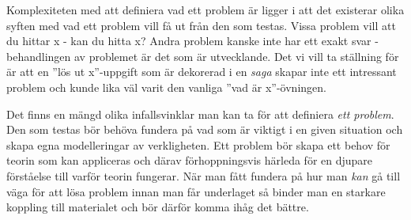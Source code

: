 
\textcolor{WildStrawberry}{
    Komplexiteten med att definiera vad ett problem är ligger i att det existerar olika syften med vad ett problem vill få ut från den som testas. Vissa problem vill att du hittar x - kan du hitta x? Andra problem kanske inte har ett exakt svar - behandlingen av problemet är det som är utvecklande. Det vi vill ta ställning för är att en ''lös ut x''-uppgift som är dekorerad i en \textit{saga} skapar inte ett intressant problem och kunde lika väl varit den vanliga ''vad är x''-övningen. 
}

\textcolor{WildStrawberry}{
    Det finns en mängd olika infallsvinklar man kan ta för att definiera \textit{ett problem}. Den som testas bör behöva fundera på vad som är viktigt i en given situation och skapa egna modelleringar av verkligheten. Ett problem bör skapa ett behov för teorin som kan appliceras och därav förhoppningsvis härleda för en djupare förståelse till varför teorin fungerar. När man fått fundera på hur man \textit{kan} gå till väga för att lösa problem innan man får underlaget så binder man en starkare koppling till materialet och bör därför komma ihåg det bättre.
}

\textcolor{WildStrawberry}{
}